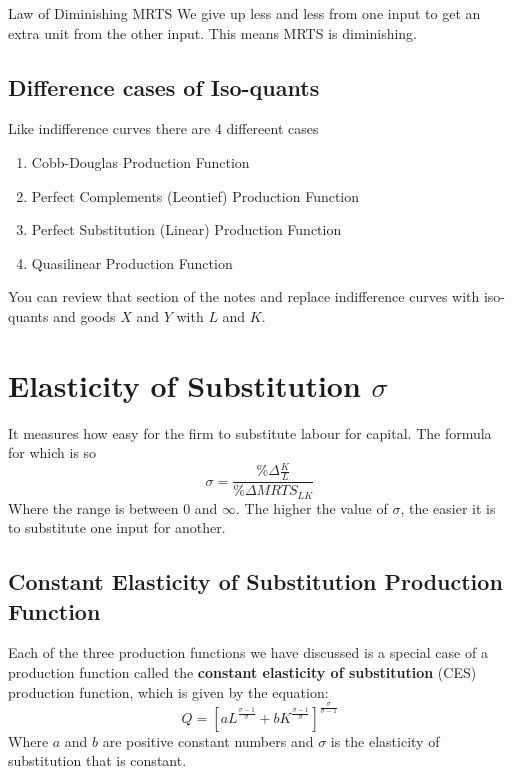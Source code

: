 \documentclass[../ECON-281-Notes.tex]{subfiles}
\begin{document}
\begin{Theorem}
    {Law of Diminishing MRTS}
    We give up less and less from one input to get an extra unit from the other input. This means MRTS is diminishing. 
\end{Theorem}

\subsection{Difference cases of Iso-quants}
Like indifference curves there are 4 differeent cases
\begin{enumerate}
    \item Cobb-Douglas Production Function
    \item Perfect Complements (Leontief) Production Function
    \item Perfect Substitution (Linear) Production Function 
    \item Quasilinear Production Function 
\end{enumerate}
You can review that section of the notes and replace indifference curves with iso-quants and goods \(X\) and \(Y\) with \(L\) and \(K\).

\section{Elasticity of Substitution \(\sigma\) } 
It measures how easy for the firm to substitute labour for capital. 
The formula for which is so 
\begin{equation}
    \sigma = \frac{\% \Delta \frac{K}{L}}{\% \Delta MRTS_{LK}}
\end{equation} 
Where the range is between \(0\) and \(\infty\).
The higher the value of \(\sigma\), the easier it is to substitute one input for another. 

\subsection{Constant Elasticity of Substitution Production Function}
Each of the three production functions we have discussed is a special case of a production function called the \textbf{constant elasticity of substitution} (CES) production function, which is given by the equation:
\begin{equation}
    Q = [aL^{\frac{\sigma - 1}{\sigma}} + bK^{\frac{\sigma - 1}{\sigma}} ]^{\frac{\sigma}{\sigma - 1}} 
\end{equation}
Where \(a\) and \(b\) are positive constant numbers and \(\sigma\) is the elasticity of substitution that is constant.
\end{document}
